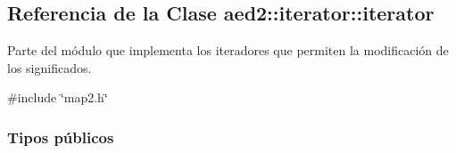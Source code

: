 \hypertarget{classaed2_1_1iterator_1_1iterator}{}\subsection{Referencia de la Clase aed2\+:\+:iterator\+:\+:iterator}
\label{classaed2_1_1iterator_1_1iterator}


Parte del módulo que implementa los iteradores que permiten la modificación de los significados.  




{\ttfamily \#include \char`\"{}map2.\+h\char`\"{}}

\subsubsection*{Tipos públicos}
